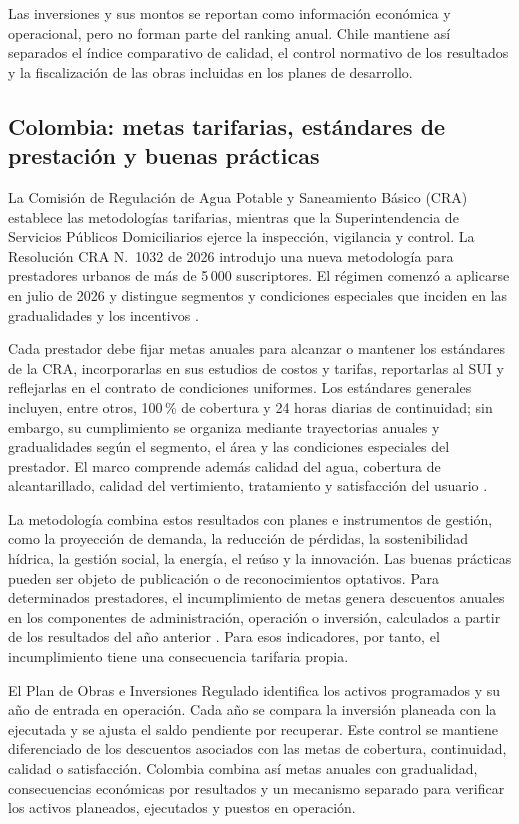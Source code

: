 Las inversiones y sus montos se reportan como información económica y operacional, pero no forman parte del ranking anual. Chile mantiene así separados el índice comparativo de calidad, el control normativo de los resultados y la fiscalización de las obras incluidas en los planes de desarrollo.

\subsection{Colombia: metas tarifarias, estándares de prestación y buenas prácticas}
\label{anexo:colombia}

La Comisión de Regulación de Agua Potable y Saneamiento Básico (CRA) establece las metodologías tarifarias, mientras que la Superintendencia de Servicios Públicos Domiciliarios ejerce la inspección, vigilancia y control. La Resolución CRA N.\textdegree~1032 de 2026 introdujo una nueva metodología para prestadores urbanos de más de 5\,000 suscriptores. El régimen comenzó a aplicarse en julio de 2026 y distingue segmentos y condiciones especiales que inciden en las gradualidades y los incentivos \citep{ColombiaLey142,CRA2026Marco}.

Cada prestador debe fijar metas anuales para alcanzar o mantener los estándares de la CRA, incorporarlas en sus estudios de costos y tarifas, reportarlas al SUI y reflejarlas en el contrato de condiciones uniformes. Los estándares generales incluyen, entre otros, 100\,\% de cobertura y 24 horas diarias de continuidad; sin embargo, su cumplimiento se organiza mediante trayectorias anuales y gradualidades según el segmento, el área y las condiciones especiales del prestador. El marco comprende además calidad del agua, cobertura de alcantarillado, calidad del vertimiento, tratamiento y satisfacción del usuario \citep{CRA2026Marco}.

La metodología combina estos resultados con planes e instrumentos de gestión, como la proyección de demanda, la reducción de pérdidas, la sostenibilidad hídrica, la gestión social, la energía, el reúso y la innovación. Las buenas prácticas pueden ser objeto de publicación o de reconocimientos optativos. Para determinados prestadores, el incumplimiento de metas genera descuentos anuales en los componentes de administración, operación o inversión, calculados a partir de los resultados del año anterior \citep{CRA2026Marco}. Para esos indicadores, por tanto, el incumplimiento tiene una consecuencia tarifaria propia.

El Plan de Obras e Inversiones Regulado identifica los activos programados y su año de entrada en operación. Cada año se compara la inversión planeada con la ejecutada y se ajusta el saldo pendiente por recuperar. Este control se mantiene diferenciado de los descuentos asociados con las metas de cobertura, continuidad, calidad o satisfacción. Colombia combina así metas anuales con gradualidad, consecuencias económicas por resultados y un mecanismo separado para verificar los activos planeados, ejecutados y puestos en operación.

